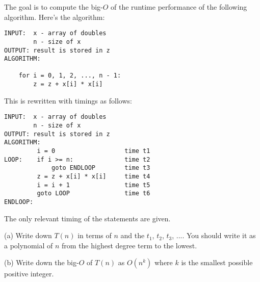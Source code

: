 The goal is to compute the big-$O$ of the runtime performance
of the following algorithm. 
Here's the algorithm:
\begin{Verbatim}[frame=single]
INPUT:  x - array of doubles
        n - size of x        
OUTPUT: result is stored in z
ALGORITHM:

    for i = 0, 1, 2, ..., n - 1:
        z = z + x[i] * x[i]
\end{Verbatim}
This is rewritten with timings as follows:
\begin{Verbatim}[frame=single]
INPUT:  x - array of doubles
        n - size of x
OUTPUT: result is stored in z
ALGORITHM:                      
         i = 0                   time t1     
LOOP:    if i >= n:              time t2      
             goto ENDLOOP        time t3      
         z = z + x[i] * x[i]     time t4      
         i = i + 1               time t5
         goto LOOP               time t6
ENDLOOP:
\end{Verbatim}
The only relevant timing of the statements are given.


(a) Write down $T(n)$ in terms of $n$ and the 
$t_1$, $t_2$, $t_3$, ....
You should write it as a polynomial of $n$ from the highest
degree term to the lowest.

(b) Write down the big-$O$ of $T(n)$ as $O(n^k)$
where $k$ is the smallest possible  positive integer.


